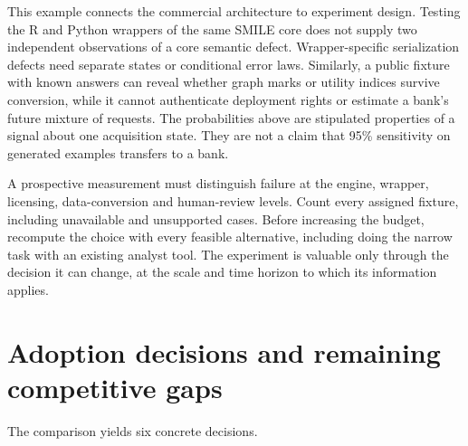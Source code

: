 This example connects the commercial architecture to experiment design. Testing
the R and Python wrappers of the same SMILE core does not supply two independent
observations of a core semantic defect. Wrapper-specific serialization defects
need separate states or conditional error laws. Similarly, a public fixture
with known answers can reveal whether graph marks or utility indices survive
conversion, while it cannot authenticate deployment rights or estimate a
bank's future mixture of requests. The probabilities above are stipulated
properties of a signal about one acquisition state. They are not a claim that
95\% sensitivity on generated examples transfers to a bank.

A prospective measurement must distinguish failure at the engine, wrapper,
licensing, data-conversion and human-review levels. Count every assigned
fixture, including unavailable and unsupported cases. Before increasing the
budget, recompute the choice with every feasible alternative, including doing
the narrow task with an existing analyst tool. The experiment is valuable only
through the decision it can change, at the scale and time horizon to which its
information applies.

\section{Adoption decisions and remaining competitive gaps}
\label{exec17:s8-decision}

The comparison yields six concrete decisions.

